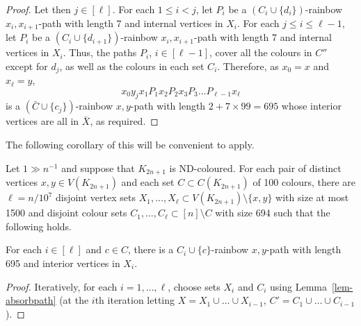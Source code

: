 \begin{proof}
Let then $j\in [\ell]$. For each $1\leq i< j$, let $P_i$ be a $(C_i\cup\{d_{i}\})$-rainbow $x_i,x_{i+1}$-path with length 7 and internal vertices in $X_i$. For each $j\leq i\leq \ell-1$, let $P_i$ be a $(C_i\cup\{d_{i+1}\})$-rainbow $x_i,x_{i+1}$-path with length 7 and internal vertices in $X_i$. Thus, the paths $P_i$, $i\in [\ell-1]$, cover all the colours in $C''$ except for $d_j$, as well as the colours in each set $C_i$.
Therefore, as $x_0=x$ and $x_\ell=y$,
\[
x_0y_jx_1P_1x_2P_2x_3P_3\ldots P_{\ell-1}x_{\ell}
\]
is a $(\bar{C}\cup \{c_j\})$-rainbow $x,y$-path with length $2+7\times 99=695$ whose interior vertices are all in $\bar{X}$, as required.
\end{proof}

The following corollary of this will be convenient to apply.
\begin{corollary}\label{cor-absorbpath}
Let $1\gg n^{-1}$ and suppose that $K_{2n+1}$ is ND-coloured. For each pair of distinct vertices $x,y\in V(K_{2n+1})$ and each set $C\subset C(K_{2n+1})$ of 100 colours, there are $\ell=n/10^7$ disjoint vertex sets $X_1,\ldots,X_\ell\subset V(K_{2n+1})\setminus \{x,y\}$ with size at most 1500 and disjoint colour sets $C_1,\ldots,C_\ell\subset [n]\setminus C$ with size 694
such that the following holds.

For each $i\in [\ell]$ and $c\in C$, there is a $C_i\cup\{c\}$-rainbow $x,y$-path with length 695 and interior vertices in $X_i$.
\end{corollary}
\begin{proof}
Iteratively, for each $i=1, \dots, \ell$, choose sets $X_i$ and $C_i$ using Lemma~\ref{lem-absorbpath} (at the $i$th iteration letting $X=X_1\cup \dots \cup X_{i-1}$, $C'=C_1\cup \dots \cup C_{i-1}$).
\end{proof}


